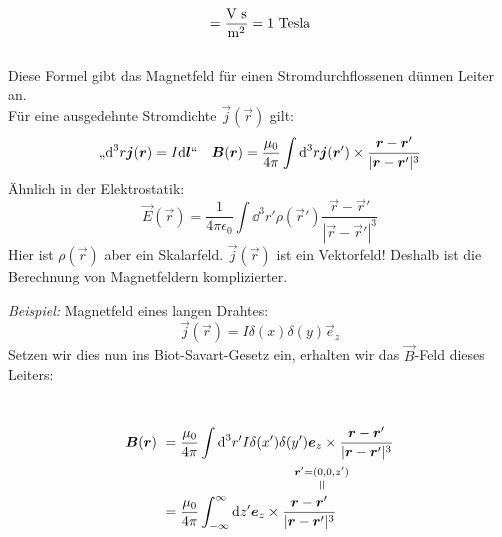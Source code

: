\begin{equation*}
[\vec{B}] = \frac{\tx{V s}}{\tx{m}^2} = 1 \tx{ Tesla}
\end{equation*}\\[5pt]
\noindent
Diese Formel gibt das Magnetfeld für einen Stromdurchflossenen dünnen Leiter an.\\[5pt]
Für eine ausgedehnte Stromdichte $ \vec{j}(\vec{r}) $ gilt:
\begin{equation*}
\textrm{,,} \textrm{d}^3 r \bm{j}(\bm{r}) = I \textrm{d} \bm{l}`` \quad \bm{B}(\bm{r}) = \frac{\mu_0}{4 \pi} \int \textrm{d}^3 r \bm{j}(\bm{r}') \times \frac{\bm{r}- \bm{r}'}{|\bm{r} - \bm{r}'|^3}
\end{equation*}
Ähnlich in der Elektrostatik:
\begin{equation*}
\vec{E}(\vec{r}) = \frac{1}{4 \pi \epsilon_0} \int \dd^3 r' \rho(\vec{r}') \frac{\vec{r} - \vec{r}'}{|\vec{r} - \vec{r}'|^3}
\end{equation*}
Hier ist $ \rho(\vec{r}) $ aber ein Skalarfeld. $ \vec{j}(\vec{r}) $ ist ein Vektorfeld! Deshalb ist die Berechnung von Magnetfeldern komplizierter.\\[5pt]
\begin{minipage}{.7\linewidth}
	\emph{Beispiel:} Magnetfeld eines langen Drahtes:
	\begin{equation*}
	\vec{j}(\vec{r}) = I \delta(x) \delta(y) \vec{e}_z
	\end{equation*}
	Setzen wir dies nun ins Biot-Savart-Gesetz ein, erhalten wir das $ \vec{B} $-Feld dieses Leiters:
\end{minipage}%
\begin{minipage}{.3\linewidth}
	\centering
\end{minipage}%
\\
\begin{align*}
\vec{B}(\vec{r}) \ &= \frac{\mu_0}{4 \pi} \int \dd^3 r' I \delta (x') \delta (y') \vec{e}_z \times \frac{\vec{r} - \vec{r}'}{|\vec{r} - \vec{r}'|^3}\\
&= \frac{\mu_0}{4 \pi} \int_{-\infty}^{\infty} \dd z' \vec{e}_z \times \frac{\vec{r} - \equaltoup{\vec{r}'}{\mathclap{\vec{r}' = (0,0,z')}}}{|\vec{r} - \vec{r}'|^3}\\
\end{align*}
